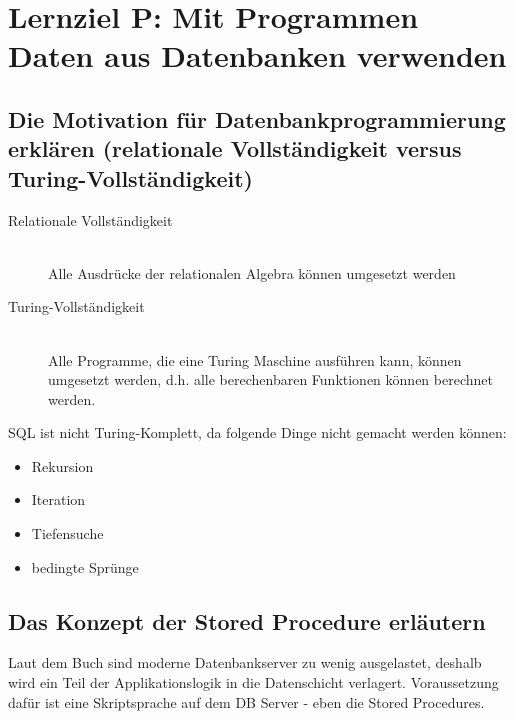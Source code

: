 \section{Lernziel P: Mit Programmen Daten aus Datenbanken verwenden}

\subsection{Die Motivation für Datenbankprogrammierung erklären (relationale Vollständigkeit versus Turing-Vollständigkeit)}

\begin{description}
    \item[Relationale Vollständigkeit] \hfill \\
    Alle Ausdrücke der relationalen Algebra können umgesetzt werden
    \item[Turing-Vollständigkeit] \hfill \\
    Alle Programme, die eine Turing Maschine ausführen kann, können umgesetzt werden, d.h. alle berechenbaren Funktionen können berechnet werden.
\end{description}
SQL ist nicht Turing-Komplett, da folgende Dinge nicht gemacht werden können:
\begin{itemize}
    \item Rekursion
    \item Iteration
    \item Tiefensuche
    \item bedingte Sprünge
\end{itemize}

\subsection{Das Konzept der Stored Procedure erläutern}

Laut dem Buch sind moderne Datenbankserver zu wenig ausgelastet, deshalb wird ein Teil der Applikationslogik in die Datenschicht verlagert. Voraussetzung dafür ist eine Skriptsprache auf dem DB Server - eben die Stored Procedures.

